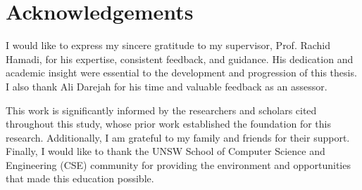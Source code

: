 \chapter*{Acknowledgements}\label{ack}

I would like to express my sincere gratitude to my supervisor, Prof. Rachid Hamadi, for his expertise, consistent feedback, and guidance. His dedication and academic insight were essential to the development and progression of this thesis. I also thank Ali Darejah for his time and valuable feedback as an assessor.

This work is significantly informed by the researchers and scholars cited throughout this study, whose prior work established the foundation for this research. Additionally, I am grateful to my family and friends for their support. Finally, I would like to thank the UNSW School of Computer Science and Engineering (CSE) community for providing the environment and opportunities that made this education possible.
